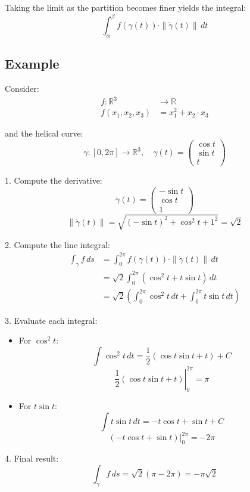 \documentclass{article}
\begin{document}
Taking the limit as the partition becomes finer yields the integral:
\[ \int_{\alpha}^{\beta} f(\gamma(t)) \cdot \|\dot{\gamma}(t)\| \, dt \]

\subsection*{Example}
Consider:
\begin{align*}
f : \mathbb{R}^3 &\to \mathbb{R} \\
f(x_1, x_2, x_3) &= x_1^2 + x_2 \cdot x_3
\end{align*}

and the helical curve:
\[ \gamma : [0, 2\pi] \to \mathbb{R}^3, \quad \gamma(t) = \begin{pmatrix} \cos t \\ \sin t \\ t \end{pmatrix} \]

1. Compute the derivative:
\[ \dot{\gamma}(t) = \begin{pmatrix} -\sin t \\ \cos t \\ 1 \end{pmatrix} \]
\[ \|\dot{\gamma}(t)\| = \sqrt{(-\sin t)^2 + \cos^2 t + 1^2} = \sqrt{2} \]

2. Compute the line integral:
\begin{align*}
\int_{\gamma} f \, ds &= \int_{0}^{2\pi} f(\gamma(t)) \cdot \|\dot{\gamma}(t)\| \, dt \\
&= \sqrt{2} \int_{0}^{2\pi} (\cos^2 t + t \sin t) \, dt \\
&= \sqrt{2} \left( \int_{0}^{2\pi} \cos^2 t \, dt + \int_{0}^{2\pi} t \sin t \, dt \right)
\end{align*}

3. Evaluate each integral:
\begin{itemize}
    \item For \( \cos^2 t \):
    \[ \int \cos^2 t \, dt = \frac{1}{2}(\cos t \sin t + t) + C \]
    \[ \left. \frac{1}{2}(\cos t \sin t + t) \right|_{0}^{2\pi} = \pi \]
    
    \item For \( t \sin t \):
    \[ \int t \sin t \, dt = -t \cos t + \sin t + C \]
    \[ \left. (-t \cos t + \sin t) \right|_{0}^{2\pi} = -2\pi \]
\end{itemize}

4. Final result:
\[ \int_{\gamma} f \, ds = \sqrt{2}(\pi - 2\pi) = -\pi\sqrt{2} \]
\vspace{5mm}
\end{document}
